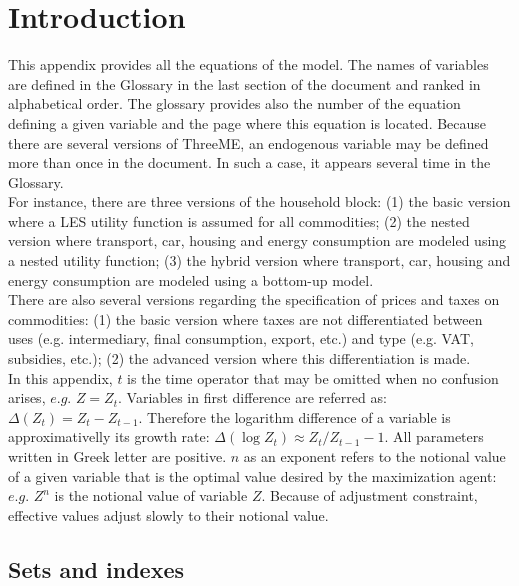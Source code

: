 \documentclass[12pt]{article}
\numberwithin{equation}{section}
\begin{document}
\fi



\section{Introduction}



This appendix provides all the equations of the model. The names of variables are defined in the Glossary in the last section of the document and ranked in alphabetical order. The glossary provides also the number of the equation defining a given variable and the page where this equation is located. Because there are several versions of ThreeME, an endogenous variable may be defined more than once in the document. In such a case, it appears several time in the Glossary. \\

For instance, there are three versions of the household block: (1) the basic version where a LES utility function is assumed for all commodities; (2) the nested version where transport, car, housing and energy consumption are modeled using a nested utility function; (3) the hybrid version where transport, car, housing and energy consumption are modeled using a bottom-up model. \\

There are also several versions regarding the specification of prices and taxes on commodities: (1) the basic version where taxes are not differentiated between uses (e.g. intermediary, final consumption, export, etc.) and type (e.g. VAT, subsidies, etc.); (2) the advanced version where this differentiation is made. \\

In this appendix, $t$ is the time operator that may be omitted when no confusion arises, $e.g.$ $Z = Z_{t}$. Variables in first difference are referred as: $\varDelta\left(Z_{t}\right) = Z_{t}-Z_{t-1}$. Therefore the logarithm difference of a variable is approximativelly its growth rate: $\varDelta\left(\operatorname{log} Z_{t}\right) \approx Z_{t}/Z_{t-1}-1$. All parameters written in Greek letter are positive. $n$ as an exponent refers to the notional value of a given variable that is the optimal value desired by the maximization agent: $e.g.$ $Z^{n}$ is the notional value of variable $Z$. Because of adjustment constraint, effective values adjust slowly to their notional value.



\subsection{Sets and indexes}
\end{document}
